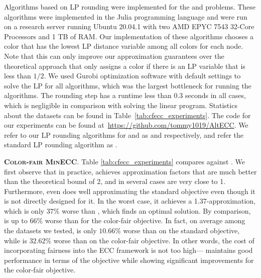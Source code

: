 Algorithms based on LP rounding were implemented for the \cfminECC{} and \pcECC{} problems. These algorithms were implemented in the Julia programming language and were run on a research server running Ubuntu 20.04.1 with two AMD EPYC 7543 32-Core Processors and 1 TB of RAM. Our implementation of these algorithms chooses a color that has the lowest LP distance variable among all colors for each node. Note that this can only improve our approximation guarantees over the theoretical approach that only assigns a color if there is an LP variable that is less than $1/2$. We used Gurobi optimization software with default settings to solve the LP for all algorithms, which was the largest bottleneck for running the algorithms. The rounding step has a runtime less than $0.3$ seconds in all cases, which is negligible in comparison with solving the linear program. Statistics about the datasets can be found in Table~\ref{tab:cfecc_experiments}. The code for our experiments can be found at~\url{https://github.com/tommy1019/AltECC}.
We refer to our LP rounding algorithms for \cfminECC{} and \pcECC{} as  \algcf{} and \algpc{} respectively, and refer the standard \minecc{} LP rounding algorithm as \algecc{}.

\textbf{\textsc{Color-fair MinECC}}.
Table \ref{tab:cfecc_experiments} compares \algcf{} against \algecc{}. We first observe that in practice, \algcf{} achieves approximation factors that are much better than the theoretical bound of 2, and in several cases are very close to 1.
Furthermore, \algcf{} even does well approximating the standard \minecc{} objective even though it is not directly designed for it. In the worst case, it achieves a 1.37-approximation, which is only $37\%$ worse than \algecc{}, which finds an optimal solution.
%
By comparison,  \algecc{} is up to $66\%$ worse than \algcf{} for the color-fair objective.
In fact, on average among the datasets we tested, \algcf{} is only $10.66\%$ worse than \algecc{} on the standard \minecc{} objective, while \algecc{} is $32.62\%$ worse than \algcf{} on the color-fair objective.
In other words, the cost of incorporating fairness into the ECC framework is not too high---\algcf{} maintains good performance in terms of the \minecc{} objective while showing significant improvements for the color-fair objective.

